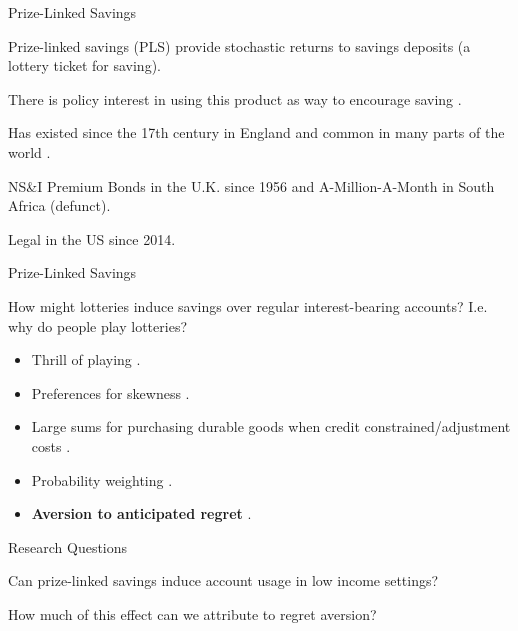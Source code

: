 \documentclass[aspectratio=169]{beamer}
\newenvironment{wideitemize}{\itemize\addtolength{\itemsep}{10pt}}{\enditemize}
\newenvironment{wideenumerate}{\enumerate\addtolength{\itemsep}{10pt}}{\endenumerate}
\begin{document}
\begin{frame}{Prize-Linked Savings}

	\begin{wideitemize}
		\item Prize-linked savings (PLS) provide stochastic returns to savings deposits (a lottery ticket for saving).
		\begin{wideitemize}
			\item There is policy interest in using this product as way to encourage saving \parencite{kearney_making_2010}.
			\item Has existed since the 17th century in England and common in many parts of the world \parencite{kearney_making_2010}.
			\item NS\&I Premium Bonds in the U.K. since 1956 and A-Million-A-Month in South Africa (defunct).
			\item Legal in the US since 2014.
		\end{wideitemize}
	\end{wideitemize}

\end{frame}

\begin{frame}{Prize-Linked Savings}

	How might lotteries induce savings over regular interest-bearing accounts? I.e. why do people play lotteries?

	\begin{itemize}
		\item Thrill of playing \parencite{conlisk_utility_1993}.
		\item Preferences for skewness \parencite{garrett_gamblers_1999}.
		\item Large sums for purchasing durable goods when credit constrained/adjustment costs \parencite{herskowitz_gambling_2016}.
		\item Probability weighting \parencite{kahneman_advances_1992}.
		\item \textbf{Aversion to anticipated regret} \parencite{loomes_regret_1982,bell_risk_1983,zeelenberg_consequences_1996}.
	\end{itemize}

\end{frame}

\begin{frame}{Research Questions}

	\begin{wideenumerate}

		\item Can prize-linked savings induce account usage in low income settings?
		\item How much of this effect can we attribute to regret aversion?

	\end{wideenumerate}

\end{frame}
\end{document}

